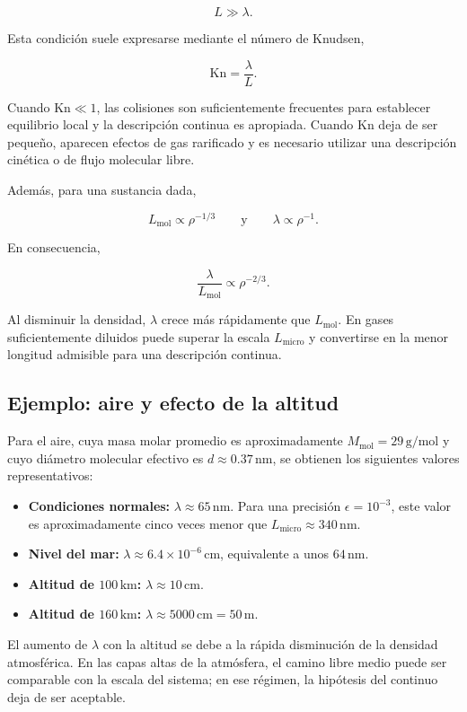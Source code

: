 $$
L\gg\lambda.
$$

Esta condición suele expresarse mediante el número de Knudsen,

$$
\mathrm{Kn}=\frac{\lambda}{L}.
$$

Cuando $\mathrm{Kn}\ll1$, las colisiones son suficientemente frecuentes para
establecer equilibrio local y la descripción continua es apropiada. Cuando
$\mathrm{Kn}$ deja de ser pequeño, aparecen efectos de gas rarificado y es
necesario utilizar una descripción cinética o de flujo molecular libre.

Además, para una sustancia dada,

$$
L_{\mathrm{mol}}\propto\rho^{-1/3}
\qquad\text{y}\qquad
\lambda\propto\rho^{-1}.
$$

En consecuencia,

$$
\frac{\lambda}{L_{\mathrm{mol}}}
\propto\rho^{-2/3}.
$$

Al disminuir la densidad, $\lambda$ crece más rápidamente que
$L_{\mathrm{mol}}$. En gases suficientemente diluidos puede superar la escala
$L_{\mathrm{micro}}$ y convertirse en la menor longitud admisible para una
descripción continua.

\subsection{Ejemplo: aire y efecto de la altitud}

Para el aire, cuya masa molar promedio es aproximadamente
$M_{\mathrm{mol}}=29\,\mathrm{g/mol}$ y cuyo diámetro molecular efectivo es
$d\approx0.37\,\mathrm{nm}$, se obtienen los siguientes valores
representativos:

\figuraCaminoLibreMedioAltitud

\begin{itemize}
    \item \textbf{Condiciones normales:}
    $\lambda\approx65\,\mathrm{nm}$. Para una precisión
    $\epsilon=10^{-3}$, este valor es aproximadamente cinco veces menor que
    $L_{\mathrm{micro}}\approx340\,\mathrm{nm}$.

    \item \textbf{Nivel del mar:}
    $\lambda\approx6.4\times10^{-6}\,\mathrm{cm}$, equivalente a unos
    $64\,\mathrm{nm}$.

    \item \textbf{Altitud de $100\,\mathrm{km}$:}
    $\lambda\approx10\,\mathrm{cm}$.

    \item \textbf{Altitud de $160\,\mathrm{km}$:}
    $\lambda\approx5000\,\mathrm{cm}=50\,\mathrm{m}$.
\end{itemize}

El aumento de $\lambda$ con la altitud se debe a la rápida disminución de la
densidad atmosférica. En las capas altas de la atmósfera, el camino libre medio
puede ser comparable con la escala del sistema; en ese régimen, la hipótesis
del continuo deja de ser aceptable.